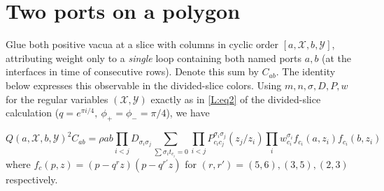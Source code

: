 \section{Two ports on a polygon}\label{L:part8}

Glue both positive vacua at a slice with columns in cyclic order \([a,\mathcal X,b,\mathcal Y]\), attributing weight only to a \emph{single} loop containing both named ports \(a,b\) (at the interfaces in time of consecutive rows). Denote this sum by \(C_{ab}\). The identity below expresses this observable in the divided-slice colors.
Using \(m,n,\sigma,D,P,w\) for the regular variables \((\mathcal X,\mathcal Y)\) exactly as in \eqref{L:eq2} of the divided-slice calculation (\(q=e^{\pi i/4},\ \phi_+=\phi_-=\pi/4\)), we have
\begin{unnumberedproposition}
\label{L:prop:two-port-identity}
\begin{equation}
 Q(a,\mathcal X,b,\mathcal Y)^2 C_{ab} =
 \rho a b \prod_{i<j}D_{\sigma_i\sigma_j}
 \sum_{\sum \sigma_i t_{c_i}=0}
 \prod_{i<j}P^{\sigma_i\sigma_j}_{c_i c_j}(z_j/z_i)
 \prod_i w_{c_i}^{\sigma_i} f_{c_i}(a,z_i) f_{c_i}(b,z_i)\label{L:eq7}
\end{equation}
where \(f_c(p,z)=(p-q^r z)(p-q^{r'}z)\) for \((r,r')=(5,6),(3,5),(2,3)\) respectively.
\end{unnumberedproposition}

